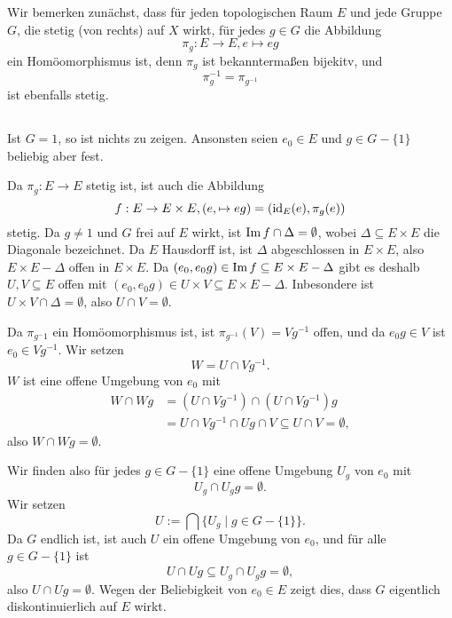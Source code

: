 \documentclass[a4paper,10pt]{article}
\begin{document}
\section{}
Wir bemerken zunächst, dass für jeden topologischen Raum $E$ und jede Gruppe $G$, die stetig (von rechts) auf $X$ wirkt, für jedes $g \in G$ die Abbildung
\[
 \pi_g : E \to E, e \mapsto eg
\]
ein Homöomorphismus ist, denn $\pi_g$ ist bekanntermaßen bijekitv, und
\[
 \pi_g^{-1} = \pi_{g^{-1}}
\]
ist ebenfalls stetig.


\subsection{}
Ist $G = 1$, so ist nichts zu zeigen. Ansonsten seien $e_0 \in E$ und $g \in G-\{1\}$ beliebig aber fest.

Da $\pi_g : E \to E$ stetig ist, ist auch die Abbildung
\[
 f : E \to E \times E, (e, \mapsto eg) = \left( \operatorname{id}_E(e), \pi_g(e) \right)
\]
stetig. Da $g \neq 1$ und $G$ frei auf $E$ wirkt, ist $\operatorname{Im} f \cap \Delta = \emptyset$, wobei $\Delta \subseteq E \times E$ die Diagonale bezeichnet. Da $E$ Hausdorff ist, ist $\Delta$ abgeschlossen in $E \times E$, also $E \times E - \Delta$ offen in $E \times E$. Da $(e_0, e_0 g) \in \operatorname{Im} f \subseteq E \times E - \Delta$ gibt es deshalb $U, V \subseteq E$ offen mit $(e_0, e_0g) \in U \times V \subseteq E \times E - \Delta$. Inbesondere ist $U \times V \cap \Delta = \emptyset$, also $U \cap V = \emptyset$.

Da $\pi_{g^-1}$ ein Homöomorphismus ist, ist $\pi_{g^{-1}}(V) = Vg^{-1}$ offen, und da $e_0 g \in V$ ist $e_0 \in Vg^{-1}$. Wir setzen
\[
 W = U \cap Vg^{-1}.
\]
$W$ ist eine offene Umgebung von $e_0$ mit
\begin{align*}
 W \cap Wg
 &= \left( U \cap Vg^{-1} \right) \cap \left( U \cap Vg^{-1} \right)g \\
 &= U \cap Vg^{-1} \cap Ug \cap V
 \subseteq U \cap V
 = \emptyset,
\end{align*}
also $W \cap Wg = \emptyset$.

Wir finden also für jedes $g \in G-\{1\}$ eine offene Umgebung $U_g$ von $e_0$ mit
\[
 U_g \cap U_g g = \emptyset.
\]
Wir setzen
\[
 U := \bigcap \{U_g \mid g \in G-\{1\}\}.
\]
Da $G$ endlich ist, ist auch $U$ ein offene Umgebung von $e_0$, und für alle $g \in G-\{1\}$ ist
\[
 U \cap Ug
 \subseteq U_g \cap U_g g
 = \emptyset,
\]
also $U \cap Ug = \emptyset$. Wegen der Beliebigkeit von $e_0 \in E$ zeigt dies, dass $G$ eigentlich diskontinuierlich auf $E$ wirkt.
\end{document}
